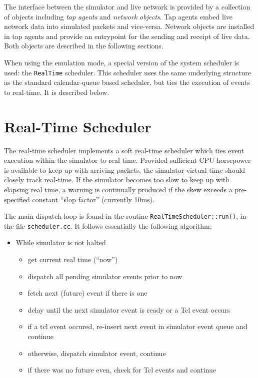 The interface between the simulator and live network is provided by
a collection of objects including {\em tap agents} and {\em network objects}.
Tap agents embed live network data into simulated packets and
vice-versa.
Network objects are installed in tap agents and provide an entrypoint
for the sending and receipt of live data.
Both objects are described in the following sections.

When using the emulation mode, a special version of the system
scheduler is used: the {\tt RealTime} scheduler.
This scheduler uses the same underlying structure as the
standard calendar-queue based scheduler, but ties the execution of
events to real-time.
It is described below.

\section{Real-Time Scheduler}

The real-time scheduler implements a soft real-time scheduler
which ties event execution within the simulator to real time.
Provided sufficient CPU horsepower is available to keep up
with arriving packets, the simulator virtual time should closely
track real-time.
If the simulator becomes too slow to keep up with elapsing real
time, a warning is continually produced if the skew exceeds a
pre-specified constant ``slop factor'' (currently 10ms).

The main dispatch loop is found in the routine {\tt RealTimeScheduler::run()},
in the file {\tt scheduler.cc}.
It follows essentially the following algorithm:
\begin{itemize}
	\item While simulator is not halted
	\begin{itemize}
		\item get current real time (``now'')
		\item dispatch all pending simulator events prior to now
		\item fetch next (future) event if there is one
		\item delay until the next simulator event is ready or a Tcl event occurs
		\item if a tcl event occured, re-insert next event in simulator event queue and continue
		\item otherwise, dispatch simulator event, continue
		\item if there was no future even, check for Tcl events and continue
	\end{itemize}
\end{itemize}

